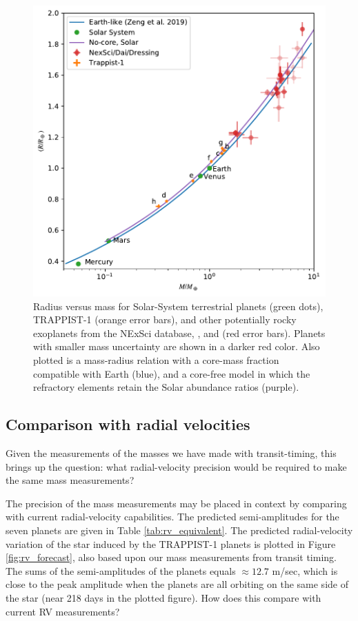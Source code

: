 \documentclass[twocolumn]{aastex63}
\begin{document}
\begin{figure}
    \centering
    \includegraphics[width = \hsize]{figures/mass_radius_relation_comparison.pdf}
    \caption{Radius versus mass for Solar-System terrestrial planets (green dots),
    TRAPPIST-1 (orange error bars), and other potentially rocky exoplanets from the NExSci database, \citet{Dressing2015},
    and \citet{Dai2019}
    (red error bars).  Planets with smaller mass uncertainty are shown in a darker red color.  Also
    plotted is a mass-radius relation with a core-mass fraction compatible with Earth (blue), and a core-free model in which the refractory elements retain the Solar abundance ratios (purple).}
    \label{fig:mass_radius_comparison}
\end{figure}

\subsection{Comparison with radial velocities}

Given the measurements of the masses we have made with transit-timing,
this brings up the question:  what radial-velocity precision would be
required to make the same mass measurements?  

The precision of the mass measurements may be placed in
context by comparing with current radial-velocity capabilities.
The predicted semi-amplitudes for the seven planets are given
in Table \ref{tab:rv_equivalent}.
The predicted radial-velocity variation of the star induced by the TRAPPIST-1
planets is plotted in Figure \ref{fig:rv_forecast}, also based upon our
mass measurements from transit timing.  The sums of the semi-amplitudes 
of the planets equals $\approx 12.7$ m/sec, which is close to the
peak amplitude when the planets are all orbiting on the same side of
the star (near 218 days in the plotted figure).  How does this compare
with current RV measurements?
\end{document}
